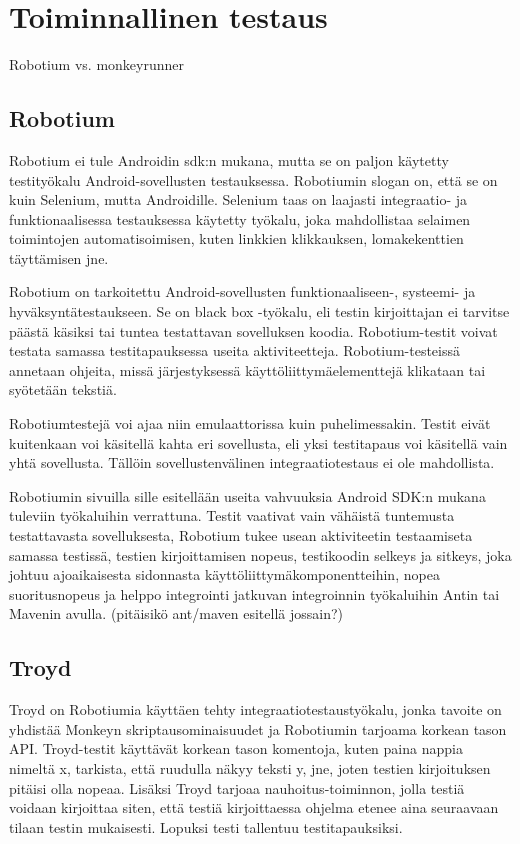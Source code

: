 \section{Toiminnallinen testaus}

Robotium vs. monkeyrunner

\subsection{Robotium}

Robotium ei tule Androidin sdk:n mukana, mutta se on paljon käytetty testityökalu Android-sovellusten testauksessa. Robotiumin slogan on, että se on kuin Selenium, mutta Androidille. Selenium taas on laajasti integraatio- ja funktionaalisessa testauksessa käytetty työkalu, joka mahdollistaa selaimen toimintojen automatisoimisen, kuten linkkien klikkauksen, lomakekenttien täyttämisen jne. \cite{selenium}

Robotium on tarkoitettu Android-sovellusten funktionaaliseen-, systeemi- ja hyväksyntätestaukseen. Se on black box -työkalu, eli testin kirjoittajan ei tarvitse päästä käsiksi tai tuntea testattavan sovelluksen koodia. Robotium-testit voivat testata samassa testitapauksessa useita aktiviteetteja. Robotium-testeissä annetaan ohjeita, missä järjestyksessä käyttöliittymäelementtejä klikataan tai syötetään tekstiä.

Robotiumtestejä voi ajaa niin emulaattorissa kuin puhelimessakin. Testit eivät kuitenkaan voi käsitellä kahta eri sovellusta, eli yksi testitapaus voi käsitellä vain yhtä sovellusta. Tällöin sovellustenvälinen integraatiotestaus ei ole mahdollista.

Robotiumin sivuilla sille esitellään useita vahvuuksia Android SDK:n mukana tuleviin työkaluihin verrattuna. Testit vaativat vain vähäistä tuntemusta testattavasta sovelluksesta, Robotium tukee usean aktiviteetin testaamiseta samassa testissä, testien kirjoittamisen nopeus, testikoodin selkeys ja sitkeys, joka johtuu ajoaikaisesta sidonnasta käyttöliittymäkomponentteihin, nopea suoritusnopeus ja helppo integrointi jatkuvan integroinnin työkaluihin Antin tai Mavenin avulla. (pitäisikö ant/maven esitellä jossain?) \cite{robotium}

\subsection{Troyd}

Troyd on Robotiumia käyttäen tehty integraatiotestaustyökalu, jonka tavoite on yhdistää Monkeyn skriptausominaisuudet ja Robotiumin tarjoama korkean tason API. Troyd-testit käyttävät korkean tason komentoja, kuten paina nappia nimeltä x, tarkista, että ruudulla näkyy teksti y, jne, joten testien kirjoituksen pitäisi olla nopeaa. Lisäksi Troyd tarjoaa nauhoitus-toiminnon, jolla testiä voidaan kirjoittaa siten, että testiä kirjoittaessa ohjelma etenee aina seuraavaan tilaan testin mukaisesti. Lopuksi testi tallentuu testitapauksiksi. \cite{troyd}

